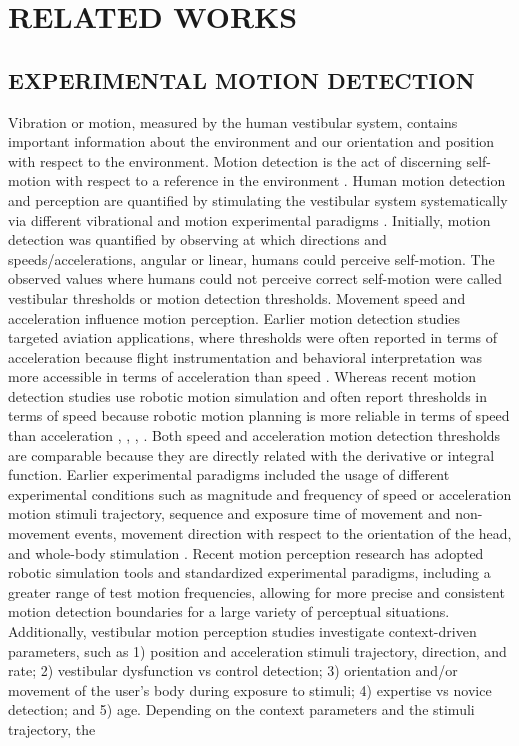 \documentclass{ieeeaccess}
\begin{document}

\section{RELATED WORKS}

\subsection{EXPERIMENTAL MOTION DETECTION}
Vibration or motion, measured by the human vestibular system, contains important information about the environment and our orientation and position with respect to the environment. Motion detection is the act of discerning self-motion with respect to a reference in the environment \cite{Chaudhuri_2013_Wholebody}. Human motion detection and perception are quantified by stimulating the vestibular system systematically via different vibrational and motion experimental paradigms \cite{Angelaki_2008_Vestibular}. Initially, motion detection was quantified by observing at which directions and speeds/accelerations, angular or linear, humans could perceive self-motion. The observed values where humans could not perceive correct self-motion were called vestibular thresholds or motion detection thresholds. Movement speed and acceleration influence motion perception. Earlier motion detection studies targeted aviation applications, where thresholds were often reported in terms of acceleration because flight instrumentation and behavioral interpretation was more accessible in terms of acceleration than speed \cite{Melvill_1978_Vertical}. Whereas recent motion detection studies use robotic motion simulation and often report thresholds in terms of speed because robotic motion planning is more reliable in terms of speed than acceleration \cite{BermudezRey_2016_Vestibular}, \cite{Hartmann_2014_Direction}, \cite{Karmali_2017_Multivariate}, \cite{Valko_2012_Vestibular}. Both speed and acceleration motion detection thresholds are comparable because they are directly related with the derivative or integral function. Earlier experimental paradigms included the usage of different experimental conditions such as magnitude and frequency of speed or acceleration motion stimuli trajectory, sequence and exposure time of movement and non-movement events, movement direction with respect to the orientation of the head, and whole-body stimulation \cite{Melvill_1978_Vertical}. Recent motion perception research has adopted robotic simulation tools and standardized experimental paradigms, including a greater range of test motion frequencies, allowing for more precise and consistent motion detection boundaries for a large variety of perceptual situations. Additionally, vestibular motion perception studies investigate context-driven parameters, such as 1) position and acceleration stimuli trajectory, direction, and rate; 2) vestibular dysfunction vs control detection; 3) orientation and/or movement of the user's body during exposure to stimuli; 4) expertise vs novice detection; and 5) age. Depending on the context parameters and the stimuli trajectory, the 
\end{document}
